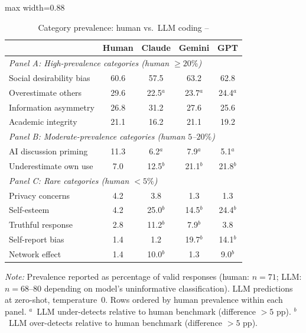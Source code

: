 \begin{table}[htbp]
    \centering
    \caption{Category prevalence: human vs.\ LLM coding -- \citet{ling2025underreporting}}
    \label{tab:ling_prevalence}
    \begin{adjustbox}{max width=0.88\linewidth}
    \small
    \begin{tabular}{lcccc}
        \toprule
        & Human & Claude & Gemini & GPT \\
        \midrule
        \multicolumn{5}{l}{\textit{Panel A: High-prevalence categories (human $\geq 20\%$)}} \\
        Social desirability bias  & 60.6 & 57.5 & 63.2 & 62.8 \\
        Overestimate others       & 29.6 & 22.5$^{a}$ & 23.7$^{a}$ & 24.4$^{a}$ \\
        Information asymmetry     & 26.8 & 31.2 & 27.6 & 25.6 \\
        Academic integrity        & 21.1 & 16.2 & 21.1 & 19.2 \\
        \midrule
        \multicolumn{5}{l}{\textit{Panel B: Moderate-prevalence categories (human $5$--$20\%$)}} \\
        AI discussion priming     & 11.3 &  6.2$^{a}$ &  7.9$^{a}$ &  5.1$^{a}$ \\
        Underestimate own use     &  7.0 & 12.5$^{b}$ & 21.1$^{b}$ & 21.8$^{b}$ \\
        \midrule
        \multicolumn{5}{l}{\textit{Panel C: Rare categories (human $< 5\%$)}} \\
        Privacy concerns          &  4.2 &  3.8 &  1.3 &  1.3 \\
        Self-esteem               &  4.2 & 25.0$^{b}$ & 14.5$^{b}$ & 24.4$^{b}$ \\
        Truthful response         &  2.8 & 11.2$^{b}$ &  7.9$^{b}$ &  3.8 \\
        Self-report bias          &  1.4 &  1.2 & 19.7$^{b}$ & 14.1$^{b}$ \\
        Network effect            &  1.4 & 10.0$^{b}$ &  1.3 &  9.0$^{b}$ \\
        \bottomrule
    \end{tabular}
    \end{adjustbox}
    \vspace{0.2cm}
    \begin{minipage}{0.88\linewidth}
        \footnotesize
        \textit{Note:} Prevalence reported as percentage of valid responses (human: $n=71$; LLM: $n=68$--$80$ depending on model's uninformative classification). LLM predictions at zero-shot, temperature~0. Rows ordered by human prevalence within each panel. $^{a}$~LLM under-detects relative to human benchmark (difference ${>}5$ pp). $^{b}$~LLM over-detects relative to human benchmark (difference ${>}5$ pp).
    \end{minipage}
\end{table}
